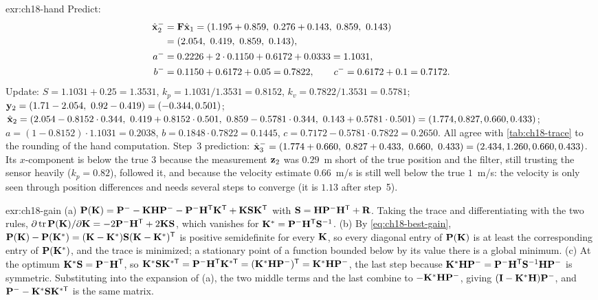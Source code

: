 
\begin{solution}{exr:ch18-hand}
Predict:
\begin{align*}
  \hat{\state}^-_2 &= \mat{F}\hat{\state}_1 = (1.195+0.859,\ 0.276+0.143,\ 0.859,\ 0.143)\\
  &= (2.054,\ 0.419,\ 0.859,\ 0.143),\\
  a^- &= 0.2226+2\cdot0.1150+0.6172+0.0333 = 1.1031,\\
  b^- &= 0.1150+0.6172+0.05 = 0.7822,\qquad c^- = 0.6172+0.1 = 0.7172.
\end{align*}
Update: $S=1.1031+0.25=1.3531$, $k_p=1.1031/1.3531=0.8152$, $k_v=0.7822/1.3531=0.5781$; $\vect{y}_2=(1.71-2.054,\ 0.92-0.419)=(-0.344,0.501)$; $\hat{\state}_2=(2.054-0.8152\cdot0.344,\ 0.419+0.8152\cdot0.501,\ 0.859-0.5781\cdot0.344,\ 0.143+0.5781\cdot0.501)=(1.774,0.827,0.660,0.433)$; $a=(1-0.8152)\cdot1.1031=0.2038$, $b=0.1848\cdot0.7822=0.1445$, $c=0.7172-0.5781\cdot0.7822=0.2650$. All agree with \cref{tab:ch18-trace} to the rounding of the hand computation. Step~3 prediction: $\hat{\state}^-_3=(1.774+0.660,\ 0.827+0.433,\ 0.660,\ 0.433)=(2.434,1.260,0.660,0.433)$. Its $x$-component is below the true $3$ because the measurement $\mathbf{z}_2$ was $0.29$~m short of the true position and the filter, still trusting the sensor heavily ($k_p=0.82$), followed it, and because the velocity estimate $0.66$~m/s is still well below the true $1$~m/s: the velocity is only seen through position differences and needs several steps to converge (it is $1.13$ after step~5).
\end{solution}

\begin{solution}{exr:ch18-gain}
(a) $\mathbf{P}(\mathbf{K})=\mathbf{P}^--\mathbf{K}\mathbf{H}\mathbf{P}^--\mathbf{P}^-\mathbf{H}^{\mathsf{T}}\mathbf{K}^{\mathsf{T}}+\mathbf{K}\mathbf{S}\mathbf{K}^{\mathsf{T}}$ with $\mathbf{S}=\mathbf{H}\mathbf{P}^-\mathbf{H}^{\mathsf{T}}+\mathbf{R}$. Taking the trace and differentiating with the two rules, $\partial\operatorname{tr}\mathbf{P}(\mathbf{K})/\partial\mathbf{K}=-2\mathbf{P}^-\mathbf{H}^{\mathsf{T}}+2\mathbf{K}\mathbf{S}$, which vanishes for $\mathbf{K}^*=\mathbf{P}^-\mathbf{H}^{\mathsf{T}}\mathbf{S}^{-1}$. (b) By \cref{eq:ch18-best-gain}, $\mathbf{P}(\mathbf{K})-\mathbf{P}(\mathbf{K}^*)=(\mathbf{K}-\mathbf{K}^*)\mathbf{S}(\mathbf{K}-\mathbf{K}^*)^{\mathsf{T}}$ is positive semidefinite for every $\mathbf{K}$, so every diagonal entry of $\mathbf{P}(\mathbf{K})$ is at least the corresponding entry of $\mathbf{P}(\mathbf{K}^*)$, and the trace is minimized; a stationary point of a function bounded below by its value there is a global minimum. (c) At the optimum $\mathbf{K}^*\mathbf{S}=\mathbf{P}^-\mathbf{H}^{\mathsf{T}}$, so $\mathbf{K}^*\mathbf{S}\mathbf{K}^{*\mathsf{T}}=\mathbf{P}^-\mathbf{H}^{\mathsf{T}}\mathbf{K}^{*\mathsf{T}}=(\mathbf{K}^*\mathbf{H}\mathbf{P}^-)^{\mathsf{T}}=\mathbf{K}^*\mathbf{H}\mathbf{P}^-$, the last step because $\mathbf{K}^*\mathbf{H}\mathbf{P}^-=\mathbf{P}^-\mathbf{H}^{\mathsf{T}}\mathbf{S}^{-1}\mathbf{H}\mathbf{P}^-$ is symmetric. Substituting into the expansion of (a), the two middle terms and the last combine to $-\mathbf{K}^*\mathbf{H}\mathbf{P}^-$, giving $(\mathbf{I}-\mathbf{K}^*\mathbf{H})\mathbf{P}^-$, and $\mathbf{P}^--\mathbf{K}^*\mathbf{S}\mathbf{K}^{*\mathsf{T}}$ is the same matrix.
\end{solution}

